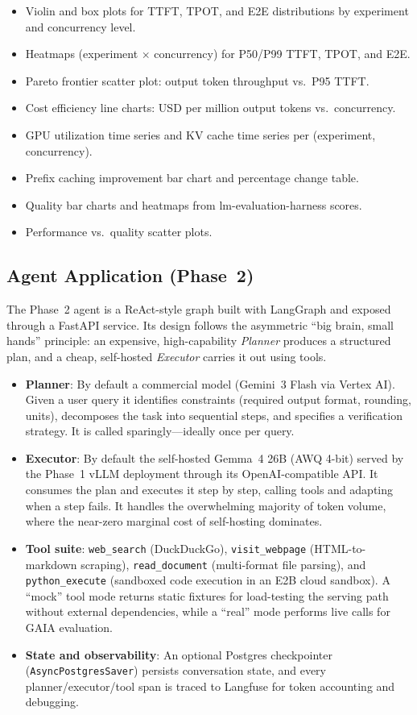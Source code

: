 \documentclass[a4paper,12pt]{report}
\begin{document}
\begin{itemize}
    \item Violin and box plots for TTFT, TPOT, and E2E distributions by experiment and concurrency level.
    \item Heatmaps (experiment $\times$ concurrency) for P50/P99 TTFT, TPOT, and E2E.
    \item Pareto frontier scatter plot: output token throughput vs.\ P95 TTFT.
    \item Cost efficiency line charts: USD per million output tokens vs.\ concurrency.
    \item GPU utilization time series and KV cache time series per (experiment, concurrency).
    \item Prefix caching improvement bar chart and percentage change table.
    \item Quality bar charts and heatmaps from lm-evaluation-harness scores.
    \item Performance vs.\ quality scatter plots.
\end{itemize}

\subsection{Agent Application (Phase~2)}

The Phase~2 agent is a ReAct-style graph built with LangGraph and exposed through a FastAPI service. Its design follows the asymmetric ``big brain, small hands'' principle: an expensive, high-capability \emph{Planner} produces a structured plan, and a cheap, self-hosted \emph{Executor} carries it out using tools.

\begin{itemize}
    \item \textbf{Planner}: By default a commercial model (Gemini~3 Flash via Vertex AI). Given a user query it identifies constraints (required output format, rounding, units), decomposes the task into sequential steps, and specifies a verification strategy. It is called sparingly---ideally once per query.
    \item \textbf{Executor}: By default the self-hosted Gemma~4 26B (AWQ 4-bit) served by the Phase~1 vLLM deployment through its OpenAI-compatible API. It consumes the plan and executes it step by step, calling tools and adapting when a step fails. It handles the overwhelming majority of token volume, where the near-zero marginal cost of self-hosting dominates.
    \item \textbf{Tool suite}: \texttt{web\_search} (DuckDuckGo), \texttt{visit\_webpage} (HTML-to-markdown scraping), \texttt{read\_document} (multi-format file parsing), and \texttt{python\_execute} (sandboxed code execution in an E2B cloud sandbox). A ``mock'' tool mode returns static fixtures for load-testing the serving path without external dependencies, while a ``real'' mode performs live calls for GAIA evaluation.
    \item \textbf{State and observability}: An optional Postgres checkpointer (\texttt{AsyncPostgresSaver}) persists conversation state, and every planner/executor/tool span is traced to Langfuse for token accounting and debugging.
\end{itemize}
\end{document}
